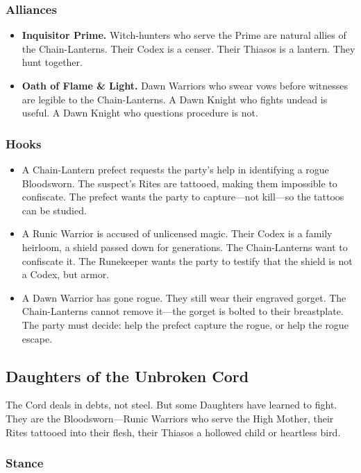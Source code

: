 \subsubsection{Alliances}

\begin{itemize}
\item \textbf{Inquisitor Prime.} Witch-hunters who serve the Prime are natural allies of the Chain-Lanterns. Their Codex is a censer. Their Thiasos is a lantern. They hunt together.
\item \textbf{Oath of Flame \& Light.} Dawn Warriors who swear vows before witnesses are legible to the Chain-Lanterns. A Dawn Knight who fights undead is useful. A Dawn Knight who questions procedure is not.
\end{itemize}

\subsubsection{Hooks}

\begin{itemize}
\item A Chain-Lantern prefect requests the party's help in identifying a rogue Bloodsworn. The suspect's Rites are tattooed, making them impossible to confiscate. The prefect wants the party to capture—not kill—so the tattoos can be studied.
\item A Runic Warrior is accused of unlicensed magic. Their Codex is a family heirloom, a shield passed down for generations. The Chain-Lanterns want to confiscate it. The Runekeeper wants the party to testify that the shield is not a Codex, but armor.
\item A Dawn Warrior has gone rogue. They still wear their engraved gorget. The Chain-Lanterns cannot remove it—the gorget is bolted to their breastplate. The party must decide: help the prefect capture the rogue, or help the rogue escape.
\end{itemize}

\subsection{Daughters of the Unbroken Cord}

The Cord deals in debts, not steel. But some Daughters have learned to fight. They are the Bloodsworn—Runic Warriors who serve the High Mother, their Rites tattooed into their flesh, their Thiasos a hollowed child or heartless bird.

\subsubsection{Stance}

